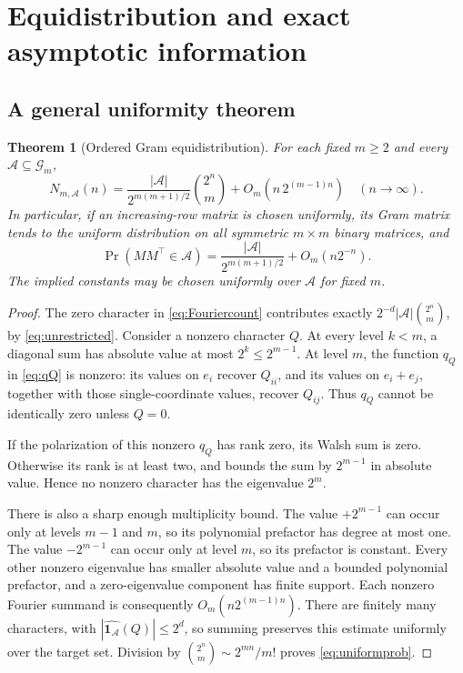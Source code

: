 \documentclass[11pt,letterpaper]{article}
\newtheorem{theorem}{Theorem}[section]
\theoremstyle{definition}
\newcommand{\1}{\mathbf 1}
\begin{document}
\section{Equidistribution and exact asymptotic information}
\label{sec:asymptotics}

\subsection{A general uniformity theorem}
\begin{theorem}[Ordered Gram equidistribution]\label{thm:uniform}
For each fixed $m\ge2$ and every $\mathcal A\subseteq\mathcal G_m$,
\begin{equation}\label{eq:uniformcount}
 N_{m,\mathcal A}(n)
 =\frac{|\mathcal A|}{2^{m(m+1)/2}}\binom{2^n}{m}
  +O_m\!\left(n\,2^{(m-1)n}\right)
 \quad(n\to\infty).
\end{equation}
In particular, if an increasing-row matrix is chosen uniformly, its Gram
matrix tends to the uniform distribution on all symmetric $m\times m$ binary
matrices, and
\begin{equation}\label{eq:uniformprob}
 \Pr(MM^\top\in\mathcal A)
 =\frac{|\mathcal A|}{2^{m(m+1)/2}}+O_m(n2^{-n}).
\end{equation}
The implied constants may be chosen uniformly over $\mathcal A$ for fixed $m$.
\end{theorem}
\begin{proof}
The zero character in \eqref{eq:Fouriercount} contributes exactly
$2^{-d}|\mathcal A|\binom{2^n}{m}$, by \eqref{eq:unrestricted}.
Consider a nonzero character $Q$.
At every level $k<m$, a diagonal sum has absolute value at most $2^k\le2^{m-1}$.
At level $m$, the function $q_Q$ in \eqref{eq:qQ} is nonzero: its values on
$e_i$ recover $Q_{ii}$, and its values on $e_i+e_j$, together with those
single-coordinate values, recover $Q_{ij}$. Thus $q_Q$ cannot be identically
zero unless $Q=0$.

If the polarization of this nonzero $q_Q$ has rank zero, its Walsh sum is zero.
Otherwise its rank is at least two, and  bounds the sum by
$2^{m-1}$ in absolute value. Hence no nonzero character has the eigenvalue
$2^m$.

There is also a sharp enough multiplicity bound. The value $+2^{m-1}$ can
occur only at levels $m-1$ and $m$, so its polynomial prefactor has degree at
most one. The value $-2^{m-1}$ can occur only at level $m$, so its prefactor is
constant. Every other nonzero eigenvalue has smaller absolute value and a
bounded polynomial prefactor, and a zero-eigenvalue component has finite
support. Each nonzero Fourier summand is consequently
$O_m(n2^{(m-1)n})$. There are finitely many characters, with
$|\widehat{\1_{\mathcal A}}(Q)|\le2^d$, so summing preserves this estimate
uniformly over the target set. Division by
$\binom{2^n}{m}\sim2^{mn}/m!$ proves \eqref{eq:uniformprob}.
\end{proof}
\end{document}
